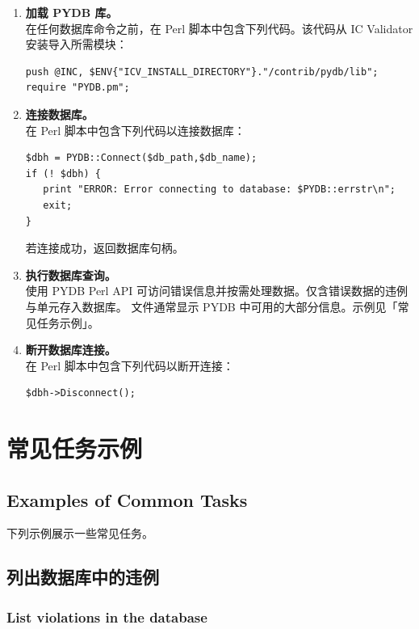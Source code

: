 \begin{enumerate}
  \item \textbf{加载 PYDB 库。}\\
在任何数据库命令之前，在 Perl 脚本中包含下列代码。该代码从 IC Validator 安装导入所需模块：
\begin{lstlisting}
push @INC, $ENV{"ICV_INSTALL_DIRECTORY"}."/contrib/pydb/lib";
require "PYDB.pm";
\end{lstlisting}

  \item \textbf{连接数据库。}\\
在 Perl 脚本中包含下列代码以连接数据库：
\begin{lstlisting}
$dbh = PYDB::Connect($db_path,$db_name);
if (! $dbh) {
   print "ERROR: Error connecting to database: $PYDB::errstr\n";
   exit;
}
\end{lstlisting}
若连接成功，返回数据库句柄。

  \item \textbf{执行数据库查询。}\\
使用 PYDB Perl API 可访问错误信息并按需处理数据。仅含错误数据的违例与单元存入数据库。 文件通常显示 PYDB 中可用的大部分信息。示例见「常见任务示例」。

  \item \textbf{断开数据库连接。}\\
在 Perl 脚本中包含下列代码以断开连接：
\begin{lstlisting}
$dbh->Disconnect();
\end{lstlisting}
\end{enumerate}

\section{常见任务示例}
\subsection*{Examples of Common Tasks}

下列示例展示一些常见任务。

\subsection{列出数据库中的违例}
\subsubsection*{List violations in the database}

